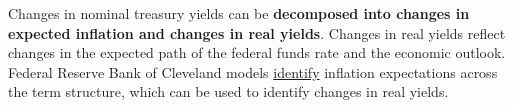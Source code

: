 \begin{minipage}{0.76\textwidth} 
 
\small Changes in nominal treasury yields can be \textbf{decomposed into changes in expected inflation and changes in real yields}. Changes in real yields reflect changes in the expected path of the federal funds rate and the economic outlook. Federal Reserve Bank of Cleveland models \href{https://www.clevelandfed.org/en/our-research/indicators-and-data/inflation-expectations.aspx}{identify} inflation expectations across the term structure, which can be used to identify changes in real yields. 


\vspace{0.5mm}

\vspace{3.8cm}


\end{minipage}
